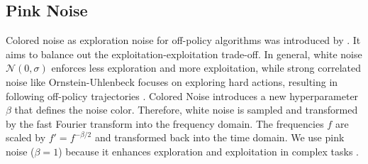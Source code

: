 \subsection{Pink Noise} \label{sec:pink}
Colored noise as exploration noise for off-policy algorithms was introduced by \cite{eberhard2023pink}. It aims to balance out the exploitation-exploitation trade-off.  In general, white noise $\mathcal{N}(0, \sigma)$ enforces less exploration and more exploitation, while strong correlated noise like Ornstein-Uhlenbeck  focuses on exploring hard actions, resulting in following off-policy trajectories \cite{eberhard2023pink}. Colored Noise introduces a new hyperparameter $\beta$ that defines the noise color. Therefore, white noise is sampled and transformed by the fast Fourier transform into the frequency domain. The frequencies $f$ are scaled by $f'= f^{-\beta/2}$ and transformed back into the time domain. We use pink noise ($\beta = 1$) because it enhances exploration and exploitation in complex tasks \cite{eberhard2023pink}.
